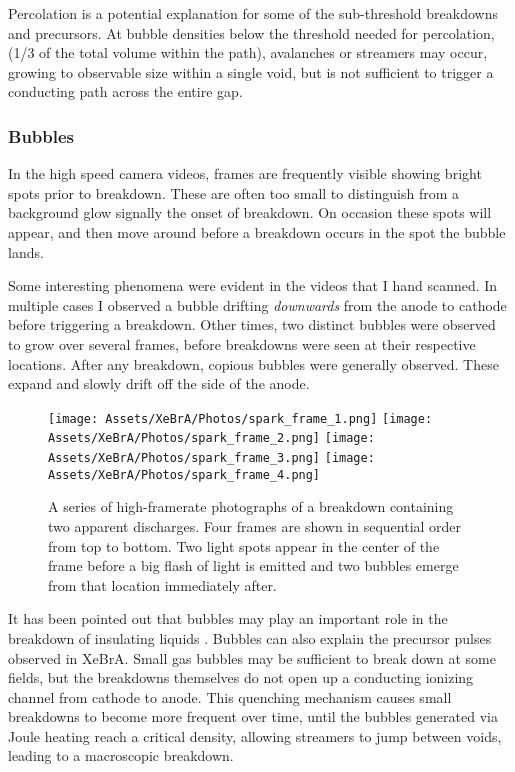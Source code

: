 Percolation is a potential explanation for some of the sub-threshold breakdowns and precursors.
At bubble densities below the threshold needed for percolation, (1/3 of the total volume within the path), avalanches or streamers may occur, growing to observable size within a single void, but is not sufficient to trigger a conducting path across the entire gap.

\subsubsection{Bubbles}
In the high speed camera videos, frames are frequently visible showing bright spots prior to breakdown.
These are often too small to distinguish from a background glow signally the onset of breakdown.
On occasion these spots will appear, and then move around before a breakdown occurs in the spot the bubble lands.

Some interesting phenomena were evident in the videos that I hand scanned.
In multiple cases I observed a bubble drifting \textit{downwards} from the anode to cathode before triggering a breakdown.
Other times, two distinct bubbles were observed to grow over several frames, before breakdowns were seen at their respective locations.
After any breakdown, copious bubbles were generally observed.
These expand and slowly drift off the side of the anode.
\begin{figure}
   \centering
    \texttt{[image: Assets/XeBrA/Photos/spark\_frame\_1.png]}
    \texttt{[image: Assets/XeBrA/Photos/spark\_frame\_2.png]}
    \texttt{[image: Assets/XeBrA/Photos/spark\_frame\_3.png]}
    \texttt{[image: Assets/XeBrA/Photos/spark\_frame\_4.png]}
    
    \caption[A series of high-framerate photographs of a breakdown containing two apparent discharges. 
    Four frames are shown in sequential]%
    {A series of high-framerate photographs of a breakdown containing two apparent discharges. 
    Four frames are shown in sequential order from top to bottom.
    Two light spots appear in the center of the frame before a big flash of light is emitted and two bubbles emerge from that location immediately after. 
    }
    \label{fig:spark_sequence}
\end{figure}

It has been pointed out that bubbles may play an important role in the breakdown of insulating liquids \cite{atrazhev_mechanisms_2010, sun_formation_2016}.
Bubbles can also explain the precursor pulses observed in XeBrA. 
Small gas bubbles may be sufficient to break down at some fields, but the breakdowns themselves do not open up a conducting ionizing channel from cathode to anode.
This quenching mechanism causes small breakdowns to become more frequent over time, until the bubbles generated via Joule heating reach a critical density, allowing streamers to jump between voids, leading to a macroscopic breakdown.

